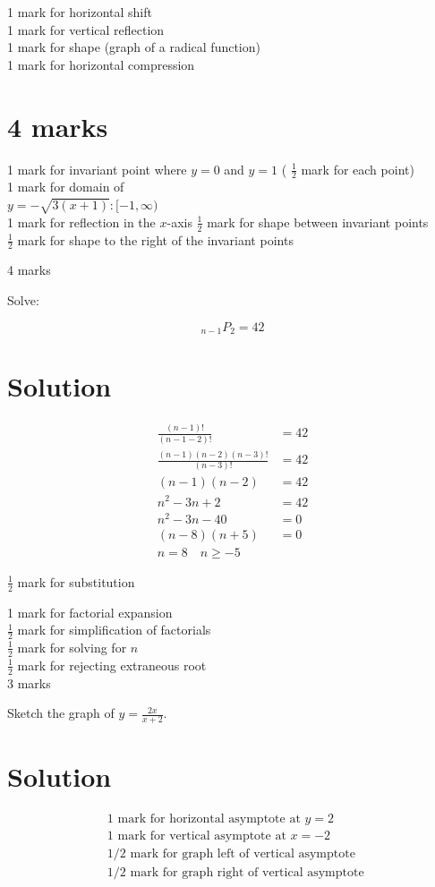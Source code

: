 \documentclass[10pt]{article}
\begin{document}
1 mark for horizontal shift\\
1 mark for vertical reflection\\
1 mark for shape (graph of a radical function)\\
1 mark for horizontal compression

\section*{4 marks}
1 mark for invariant point where $y=0$ and $y=1$ ( $\frac{1}{2}$ mark for each point)\\
1 mark for domain of\\
$y=-\sqrt{3(x+1)}:[-1, \infty)$\\
1 mark for reflection in the $x$-axis $\frac{1}{2}$ mark for shape between invariant points\\
$\frac{1}{2}$ mark for shape to the right of the invariant points

4 marks

Solve:

$$
{ }_{n-1} P_{2}=42
$$

\section*{Solution}
$$
\begin{aligned}
\frac{(n-1)!}{(n-1-2)!} & =42 \\
\frac{(n-1)(n-2)(n-3)!}{(n-3)!} & =42 \\
(n-1)(n-2) & =42 \\
n^{2}-3 n+2 & =42 \\
n^{2}-3 n-40 & =0 \\
(n-8)(n+5) & =0 \\
n=8 \quad n \geq-5 &
\end{aligned}
$$

$\frac{1}{2}$ mark for substitution

1 mark for factorial expansion\\
$\frac{1}{2}$ mark for simplification of factorials\\
$\frac{1}{2}$ mark for solving for $n$\\
$\frac{1}{2}$ mark for rejecting extraneous root\\
3 marks

Sketch the graph of $y=\frac{2 x}{x+2}$.

\section*{Solution}
$$
\begin{aligned}
& 1 \text { mark for horizontal asymptote at } y=2 \\
& 1 \text { mark for vertical asymptote at } x=-2 \\
& 1 / 2 \text { mark for graph left of vertical asymptote } \\
& 1 / 2 \text { mark for graph right of vertical asymptote }
\end{aligned}
$$
\end{document}
